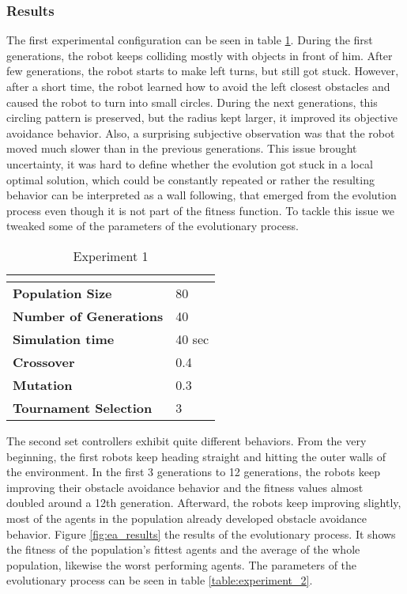 \documentclass[format=acmsmall, review=false, screen=true]{acmart}
\begin{document}
\subsubsection{Results}

The first experimental configuration can be seen in table \ref{fig:experiment_1}. During the first generations, the robot keeps colliding mostly with objects in front of him. After few generations, the robot starts to make left turns, but still got stuck. However, after a short time, the robot learned how to avoid the left closest obstacles and caused the robot to turn into small circles. During the next generations, this circling pattern is preserved, but the radius kept larger, it improved its objective avoidance behavior. Also, a surprising subjective observation was that the robot moved much slower than in the previous generations. This issue brought uncertainty, it was hard to define whether the evolution got stuck in a local optimal solution, which could be constantly repeated or rather the resulting behavior can be interpreted as a wall following, that emerged from the evolution process even though it is not part of the fitness function. To tackle this issue we tweaked some of the parameters of the evolutionary process.

\begin{table}[H]
\begin{tabular}{ll}
\hline
\textbf{}                      & \textbf{} \\ \hline
\textbf{Population Size}       & 80        \\
\textbf{Number of Generations} & 40        \\
\textbf{Simulation time}       & 40 sec    \\
\textbf{Crossover}             & 0.4       \\
\textbf{Mutation}              & 0.3       \\
\textbf{Tournament Selection}  & 3        
\end{tabular}
\caption{Experiment 1}
\label{fig:experiment_1}
\end{table}


The second set controllers exhibit quite different behaviors. From the very beginning, the first robots keep heading straight and hitting the outer walls of the environment. In the first 3 generations to 12 generations, the robots keep improving their obstacle avoidance behavior and the fitness values almost doubled around a 12th generation. Afterward, the robots keep improving slightly, most of the agents in the population already developed obstacle avoidance behavior. Figure \ref{fig:ea_results} the results of the evolutionary process. It shows the fitness of the population's fittest agents and the average of the whole population, likewise the worst performing agents. The parameters of the evolutionary process can be seen in table \ref{table:experiment_2}.
\end{document}
